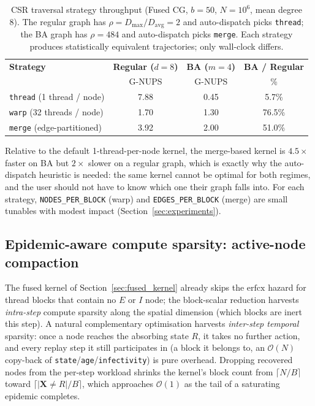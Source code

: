 \documentclass[a4paper,fleqn]{cas-sc}
\theoremstyle{definition}
\theoremstyle{remark}
\newcommand{\bigO}{\mathcal{O}}
\begin{document}
\begin{table}[!h]
\caption{CSR traversal strategy throughput (Fused CG, $b = 50$, $N = 10^6$, mean degree 8). The regular graph has $\rho = D_{\max}/D_{\mathrm{avg}} = 2$ and auto-dispatch picks \texttt{thread}; the BA graph has $\rho = 484$ and auto-dispatch picks \texttt{merge}. Each strategy produces statistically equivalent trajectories; only wall-clock differs.}
\label{tab:csr_dispatch}
\centering
\begin{tabular*}{\tblwidth}{@{}lccc@{}}
\toprule
\textbf{Strategy} & \textbf{Regular ($d=8$)} & \textbf{BA ($m=4$)} & \textbf{BA / Regular} \\
 & G-NUPS & G-NUPS & \% \\
\midrule
\texttt{thread} (1 thread / node)        & 7.88 & 0.45 & 5.7\%  \\
\texttt{warp} (32 threads / node)        & 1.70 & 1.30 & 76.5\% \\
\texttt{merge} (edge-partitioned)        & 3.92 & 2.00 & 51.0\% \\
\bottomrule
\end{tabular*}
\end{table}

Relative to the default 1-thread-per-node kernel, the merge-based kernel is $4.5\times$ faster on BA but $2\times$ slower on a regular graph, which is exactly why the auto-dispatch heuristic is needed: the same kernel cannot be optimal for both regimes, and the user should not have to know which one their graph falls into. For each strategy, \texttt{NODES\_PER\_BLOCK} (warp) and \texttt{EDGES\_PER\_BLOCK} (merge) are small tunables with modest impact (Section~\ref{sec:experiments}).

\subsection{Epidemic-aware compute sparsity: active-node compaction}
\label{sec:compaction}

The fused kernel of Section~\ref{sec:fused_kernel} already skips the $\mathrm{erfcx}$ hazard for thread blocks that contain no $E$ or $I$ node; the block-scalar reduction harvests \emph{intra-step} compute sparsity along the spatial dimension (which blocks are inert this step). A natural complementary optimisation harvests \emph{inter-step temporal} sparsity: once a node reaches the absorbing state $R$, it takes no further action, and every replay step it still participates in (a block it belongs to, an $\bigO(N)$ copy-back of \texttt{state}/\texttt{age}/\texttt{infectivity}) is pure overhead. Dropping recovered nodes from the per-step workload shrinks the kernel's block count from $\lceil N/B \rceil$ toward $\lceil |\mathbf{X}{\ne}R| / B \rceil$, which approaches $\bigO(1)$ as the tail of a saturating epidemic completes.
\end{document}
